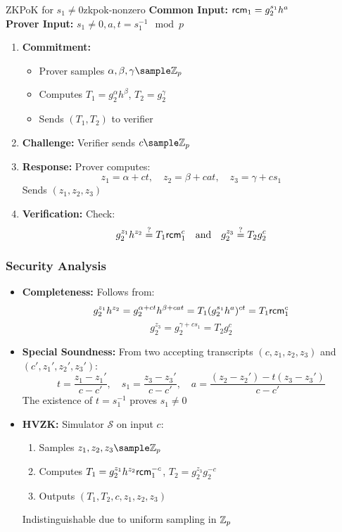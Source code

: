 \begin{protocol}{ZKPoK for \(s_1 \neq 0\)}{zkpok-nonzero}
\textbf{Common Input:} \(\mathsf{rcm}_1 = g_2^{s_1}h^a\)\\
\textbf{Prover Input:} \(s_1 \neq 0, a, t = s_1^{-1} \mod p\)
\begin{enumerate}
    \item \textbf{Commitment:}
    \begin{itemize}
        \item Prover samples \(\alpha, \beta, \gamma \sample \Z_p\)
        \item Computes \(T_1 = g_2^\alpha h^\beta\), \(T_2 = g_2^\gamma\)
        \item Sends \((T_1, T_2)\) to verifier
    \end{itemize}
    
    \item \textbf{Challenge:} Verifier sends \(c \sample \Z_p\)
    
    \item \textbf{Response:} Prover computes:
    \[
    z_1 = \alpha + c t, \quad z_2 = \beta + c a t, \quad z_3 = \gamma + c s_1
    \]
    Sends \((z_1, z_2, z_3)\)
    
    \item \textbf{Verification:} Check:
    \[
    g_2^{z_1}h^{z_2} \stackrel{?}{=} T_1 \mathsf{rcm}_1^c \quad \text{and} \quad g_2^{z_3} \stackrel{?}{=} T_2 g_2^c
    \]
\end{enumerate}
\end{protocol}

\subsubsection{Security Analysis}
\begin{itemize}
    \item \textbf{Completeness:} Follows from:
    \[
    g_2^{z_1}h^{z_2} = g_2^{\alpha + c t}h^{\beta + c a t} = T_1(g_2^{s_1}h^a)^{c t} = T_1\mathsf{rcm}_1^c
    \]
    \[
    g_2^{z_3} = g_2^{\gamma + c s_1} = T_2g_2^c
    \]
    
    \item \textbf{Special Soundness:} From two accepting transcripts \((c, z_1, z_2, z_3)\) and \((c', z_1', z_2', z_3')\):
    \[
    t = \frac{z_1 - z_1'}{c - c'}, \quad s_1 = \frac{z_3 - z_3'}{c - c'}, \quad a = \frac{(z_2 - z_2') - t(z_3 - z_3')}{c - c'}
    \]
    The existence of \(t = s_1^{-1}\) proves \(s_1 \neq 0\)
    
    \item \textbf{HVZK:} Simulator \(\mathcal{S}\) on input \(c\):
    \begin{enumerate}
        \item Samples \(z_1, z_2, z_3 \sample \Z_p\)
        \item Computes \(T_1 = g_2^{z_1}h^{z_2}\mathsf{rcm}_1^{-c}\), \(T_2 = g_2^{z_3}g_2^{-c}\)
        \item Outputs \((T_1, T_2, c, z_1, z_2, z_3)\)
    \end{enumerate}
    Indistinguishable due to uniform sampling in \(\mathbb{Z}_p\)
\end{itemize}

